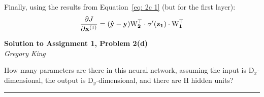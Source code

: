 \documentclass[letter,12pt]{article}
\newcommand{\myhwtitle}[3]
{\begin{center}
{\large {\bf Solution to Assignment {#1}, Problem {#2}}}\\
\medskip 
{\it {#3}} %
\end{center}}
\begin{document}
Finally, using the results from Equation~\ref{eq: 2c 1} (but for the first layer):
\begin{equation}
\frac{\partial{J}}{\partial{{\bf x}^{(1)}}} = (\bf{\hat{y}} - \bf{y}){\bf \textrm{W}^{\top}_{2}}\cdot\sigma^{\prime}(z_{1})\cdot{\bf \textrm{W}^{\top}_{1}}
\end{equation}

\clearpage

\myhwtitle{1}{2(d)}{Gregory King}
\bigskip
\noindent How many parameters are there in this neural network, assuming the input is $\textrm{D}_{x}$-dimensional,
the output is $\textrm{D}_{y}$-dimensional, and there are H hidden units?\vspace{5mm}

\noindent\rule{\textwidth}{0.4pt}
\end{document}
